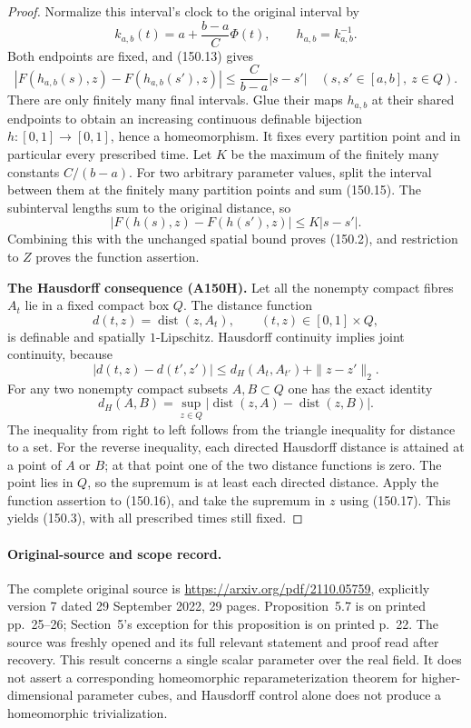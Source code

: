 \begin{proof}
Normalize this interval's clock to the original interval by
\[
 k_{a,b}(t)=a+\frac{b-a}{C}\Phi(t),\qquad
 h_{a,b}=k_{a,b}^{-1}.
 \tag{150.14}
\]
Both endpoints are fixed, and (150.13) gives
\[
 |F(h_{a,b}(s),z)-F(h_{a,b}(s'),z)|
 \le\frac{C}{b-a}|s-s'|
 \quad(s,s'\in[a,b],\ z\in Q).
 \tag{150.15}
\]
There are only finitely many final intervals. Glue their maps
$h_{a,b}$ at their shared endpoints to obtain an increasing
continuous definable bijection $h:[0,1]\to[0,1]$, hence a
homeomorphism. It fixes every partition point and in particular
every prescribed time. Let $K$ be the maximum of the finitely many
constants $C/(b-a)$. For two arbitrary parameter values, split the
interval between them at the finitely many partition points and
sum (150.15). The subinterval lengths sum to the original distance,
so
\[
 |F(h(s),z)-F(h(s'),z)|\le K|s-s'|.
\]
Combining this with the unchanged spatial bound proves (150.2),
and restriction to $Z$ proves the function assertion.

\textbf{The Hausdorff consequence (A150H).}\quad
Let all the nonempty compact fibres $A_t$ lie in a fixed compact box
$Q$. The distance function
\[
 d(t,z)=\operatorname{dist}(z,A_t),\qquad (t,z)\in[0,1]\times Q,
 \tag{150.16}
\]
is definable and spatially $1$-Lipschitz. Hausdorff continuity implies
joint continuity, because
\[
 |d(t,z)-d(t',z')|
 \le d_H(A_t,A_{t'})+\|z-z'\|_2.
\]
For any two nonempty compact subsets $A,B\subset Q$ one has the
exact identity
\[
 d_H(A,B)=\sup_{z\in Q}
       |\operatorname{dist}(z,A)-\operatorname{dist}(z,B)|.
 \tag{150.17}
\]
The inequality from right to left follows from the triangle inequality
for distance to a set. For the reverse inequality, each directed
Hausdorff distance is attained at a point of $A$ or $B$; at that point
one of the two distance functions is zero. The point lies in $Q$,
so the supremum is at least each directed distance.
Apply the function assertion to (150.16), and take the supremum in
$z$ using (150.17). This yields (150.3), with all prescribed times
still fixed.
\end{proof}

\paragraph{Original-source and scope record.}
The complete original source is
\url{https://arxiv.org/pdf/2110.05759}, explicitly version 7 dated
29 September 2022, 29 pages. Proposition~5.7 is on printed
pp.~25--26; Section~5's exception for this proposition is on printed
p.~22. The source was freshly opened and its full relevant statement
and proof read after recovery. This result concerns a single scalar
parameter over the real field. It does not assert a corresponding
homeomorphic reparameterization theorem for higher-dimensional
parameter cubes, and Hausdorff control alone does not produce a
homeomorphic trivialization.
